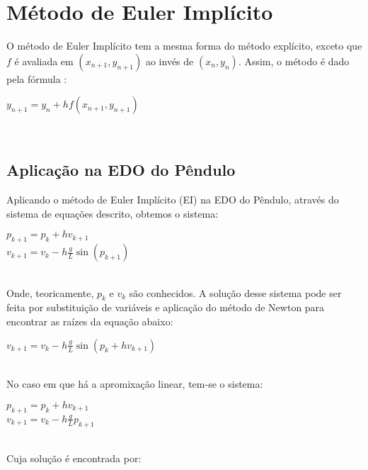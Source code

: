 \documentclass{amsart}
\theoremstyle{definition}
\theoremstyle{remark}
\numberwithin{equation}{section}
\begin{document}
\section{Método de Euler Implícito}
O método de Euler Implícito tem a mesma forma do método explícito, exceto que $f$ é avaliada em $(x_{n+1}, y_{n+1})$ ao invés de $(x_n, y_n)$. Assim, o método é dado pela fórmula \cite{A}:\\
\begin{flushleft}
$y_{n+1}=y_n+hf(x_{n+1},y_{n+1})$\\
\end{flushleft} \ \\

\subsection{Aplicação na EDO do Pêndulo}

Aplicando o método de Euler Implícito (EI) na EDO do Pêndulo, através do sistema de equações descrito, obtemos o sistema: \\

\begin{flushleft}
$p_{k+1}=p_k+hv_{k+1}$\\
$v_{k+1}=v_k-h\frac{g}{L}\sin(p_{k+1})$\\
\end{flushleft} \ \\

Onde, teoricamente, $p_k$ e $v_k$ são conhecidos. A solução desse sistema pode ser feita por substituição de variáveis e aplicação do método de Newton para encontrar as raízes da equação abaixo:\\

\begin{flushleft}
$v_{k+1}=v_k-h\frac{g}{L}\sin(p_k+hv_{k+1})$ \\
\end{flushleft} \ \\

No caso em que há a apromixação linear, tem-se o sistema:\\

\begin{flushleft}
$p_{k+1}=p_k+hv_{k+1}$\\
$v_{k+1}=v_k-h\frac{g}{L}p_{k+1}$\\
\end{flushleft} \ \\

Cuja solução é encontrada por:\\
\end{document}
